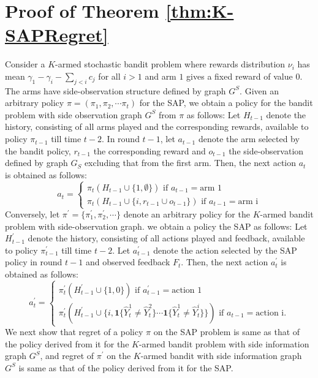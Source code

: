 \documentclass{article}
\begin{document}
\section{Proof of Theorem \ref{thm:K-SAPRegret}}

Consider a $K$-armed stochastic bandit problem where rewards distribution $\nu_i$ has mean  $\gamma_1-\gamma_i- \sum_{j< i}c_j$ for all $i >1$ and arm $1$ gives a fixed reward of value $0$. The arms have side-observation structure defined by graph $G^S$.  
Given an arbitrary policy $\pi=(\pi_1, \pi_2, \cdots \pi_t )$ for the SAP, we obtain a policy for the bandit problem with side observation graph $G^S$ from $\pi$ as follows: Let $H_{t-1}$ denote the history, consisting of all arms played and the corresponding rewards, available to policy $\pi_{t-1}$ till time $t-2$. In round $t-1$, let $a_{t-1}$ denote the arm selected by the bandit policy,  $r_{t-1}$ the corresponding reward and $o_{t-1}$ the side-observation defined by graph $G_S$ excluding that from the first arm. Then, the next action $a_t$ is obtained as follows:
\begin{equation}
\label{eqn:SAPtoKBandit}
a_t=
\begin{cases}
\pi_t(H_{t-1}\cup \{1, \emptyset
\}) \mbox{ if } a_{t-1}= \mbox{arm 1}	\\
\pi_t(H_{t-1} \cup \{i, r_{t-1}\cup o_{t-1}\}) \mbox{ if } a_{t-1}= \mbox{arm i}
\end{cases}
\end{equation}
\noindent
Conversely, let $\pi^\prime=\{\pi^\prime_1, \pi^\prime_2,\cdots\}$ denote an arbitrary policy for the $K$-armed bandit problem with side-observation graph. we obtain a policy the SAP as follows: Let $H^\prime_{t-1}$ denote the history, consisting of all actions played and feedback, available to policy $\pi^\prime_{t-1}$ till time $t-2$. Let $a^\prime_{t-1}$ denote the action selected by the SAP policy in round $t-1$ and observed feedback $F_t$. Then, the next action $a^\prime_t$ is obtained as follows:
\begin{equation}
\label{eqn:KBanditToSAP}
a^\prime_t=
\begin{cases}
\pi^\prime_t(H^\prime_{t-1} \cup \{1, 0
\}) \mbox{ if } a^\prime_{t-1}= \mbox{action 1}	\\
\pi^\prime_t(H^\prime_{t-1} \cup \{i, \boldsymbol{1}\{\hat{Y}_t^1\neq \hat{Y}_t^2\}\cdots \boldsymbol{1}\{\hat{Y}_t^1\neq \hat{Y}_t^i\}\}) \mbox{ if } a_{t-1}= \mbox{action i}.
\end{cases}
\end{equation}
We next show that regret of a policy $\pi$ on the SAP problem is same as that of the policy derived from it for the $K$-armed bandit problem with side information graph $G^S$, 
and regret of $\pi^\prime$ on the $K$-armed bandit with side information graph  $G^S$ is same as that of the policy derived from it for the SAP.
\end{document}
